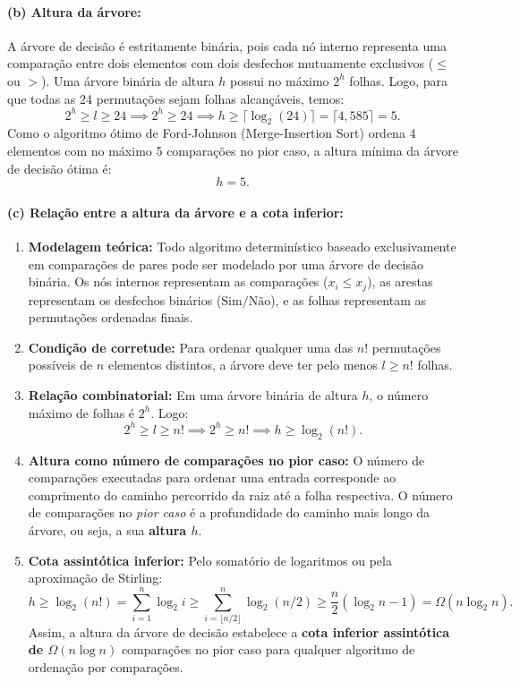 \documentclass[11pt,a4paper]{article}
\begin{document}
\paragraph{(b) Altura da árvore:}
A árvore de decisão é estritamente binária, pois cada nó interno representa uma comparação entre dois elementos com dois desfechos mutuamente exclusivos ($\le$ ou $>$). Uma árvore binária de altura $h$ possui no máximo $2^h$ folhas. Logo, para que todas as 24 permutações sejam folhas alcançáveis, temos:
\begin{equation}
    2^h \ge l \ge 24 \implies 2^h \ge 24 \implies h \ge \lceil \log_2(24) \rceil = \lceil 4{,}585 \rceil = 5.
\end{equation}
Como o algoritmo ótimo de Ford-Johnson (Merge-Insertion Sort) ordena 4 elementos com no máximo 5 comparações no pior caso, a altura mínima da árvore de decisão ótima é:
\begin{equation}
    h = 5.
\end{equation}

\paragraph{(c) Relação entre a altura da árvore e a cota inferior:}
\begin{enumerate}
    \item \textbf{Modelagem teórica:} Todo algoritmo determinístico baseado exclusivamente em comparações de pares pode ser modelado por uma árvore de decisão binária. Os nós internos representam as comparações ($x_i \le x_j$), as arestas representam os desfechos binários ($\text{Sim} / \text{Não}$), e as folhas representam as permutações ordenadas finais.
    \item \textbf{Condição de corretude:} Para ordenar qualquer uma das $n!$ permutações possíveis de $n$ elementos distintos, a árvore deve ter pelo menos $l \ge n!$ folhas.
    \item \textbf{Relação combinatorial:} Em uma árvore binária de altura $h$, o número máximo de folhas é $2^h$. Logo:
    \[
        2^h \ge l \ge n! \implies 2^h \ge n! \implies h \ge \log_2(n!).
    \]
    \item \textbf{Altura como número de comparações no pior caso:} O número de comparações executadas para ordenar uma entrada corresponde ao comprimento do caminho percorrido da raiz até a folha respectiva. O número de comparações no \emph{pior caso} é a profundidade do caminho mais longo da árvore, ou seja, a sua \textbf{altura $h$}.
    \item \textbf{Cota assintótica inferior:} Pelo somatório de logaritmos ou pela aproximação de Stirling:
    \[
        h \ge \log_2(n!) = \sum_{i=1}^n \log_2 i \ge \sum_{i=\lfloor n/2 \rfloor}^n \log_2(n/2) \ge \frac{n}{2}(\log_2 n - 1) = \Omega(n \log_2 n).
    \]
    Assim, a altura da árvore de decisão estabelece a \textbf{cota inferior assintótica de $\Omega(n \log n)$} comparações no pior caso para qualquer algoritmo de ordenação por comparações.
\end{enumerate}
\end{document}
